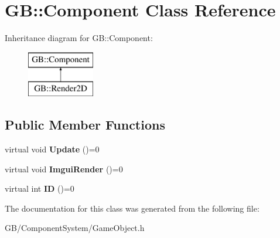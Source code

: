 \hypertarget{class_g_b_1_1_component}{}\section{GB\+::Component Class Reference}
\label{class_g_b_1_1_component}
Inheritance diagram for GB\+::Component\+:\begin{figure}[H]
\begin{center}
\leavevmode
\includegraphics[height=2.000000cm]{class_g_b_1_1_component}
\end{center}
\end{figure}
\subsection*{Public Member Functions}
\begin{DoxyCompactItemize}
\item 
\mbox{\label{class_g_b_1_1_component_a84e2df3e830473c226e591a8d759917f}} 
virtual void {\bfseries Update} ()=0
\item 
\mbox{\label{class_g_b_1_1_component_a7888b2328c54d8149827cb1115773d7d}} 
virtual void {\bfseries Imgui\+Render} ()=0
\item 
\mbox{\label{class_g_b_1_1_component_a59a1164303952c19b96c55ba9efaebb3}} 
virtual int {\bfseries ID} ()=0
\end{DoxyCompactItemize}


The documentation for this class was generated from the following file\+:\begin{DoxyCompactItemize}
\item 
G\+B/\+Component\+System/Game\+Object.\+h\end{DoxyCompactItemize}

